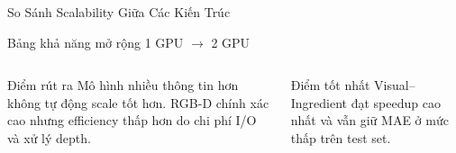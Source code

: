 \documentclass[10pt,aspectratio=169]{beamer}
\begin{document}
\begin{frame}{So Sánh Scalability Giữa Các Kiến Trúc}
\scriptsize
\begin{accentbox}{Bảng khả năng mở rộng 1 GPU $\rightarrow$ 2 GPU}
\centering
\renewcommand{\arraystretch}{1.15}
\end{accentbox}

\vspace{0.12cm}
\begin{columns}[T]
\begin{uitbox}{Điểm rút ra}
Mô hình nhiều thông tin hơn không tự động scale tốt hơn. RGB-D chính xác cao nhưng efficiency thấp hơn do chi phí I/O và xử lý depth.
\end{uitbox}
\begin{greenbox}{Điểm tốt nhất}
Visual--Ingredient đạt speedup cao nhất và vẫn giữ MAE ở mức thấp trên test set.
\end{greenbox}
\end{columns}
\end{frame}
\end{document}
